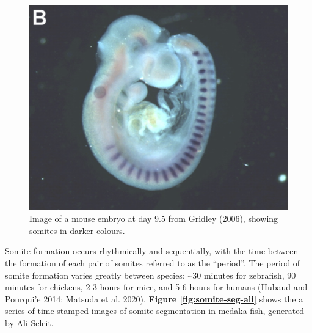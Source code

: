 \documentclass[
]{book}
\begin{document}
\begin{figure}
\includegraphics[width=1\linewidth]{figs/somites/mouse_embryo_gridley} \caption{Image of a mouse embryo at day 9.5 from Gridley (2006), showing somites in darker colours.}\label{fig:mouse-embryo}
\end{figure}

Somite formation occurs rhythmically and sequentially, with the time between the formation of each pair of somites referred to as the ``period''. The period of somite formation varies greatly between species: \textasciitilde30 minutes for zebrafish, 90 minutes for chickens, 2-3 hours for mice, and 5-6 hours for humans (Hubaud and Pourqui'e 2014; Matsuda et al. 2020). \textbf{Figure \ref{fig:somite-seg-ali}} shows the a series of time-stamped images of somite segmentation in medaka fish, generated by Ali Seleit.
\end{document}
